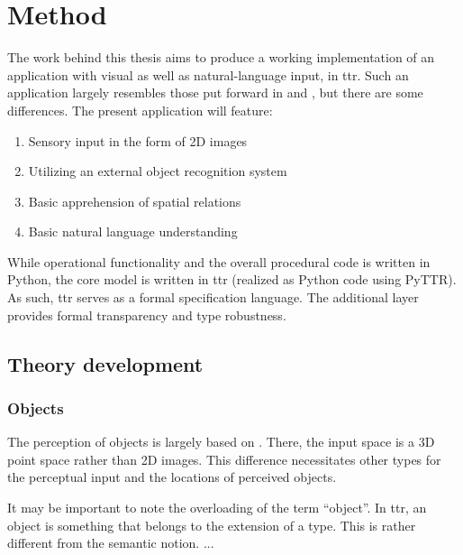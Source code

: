 \section{Method}
\label{sec:method}

The work behind this thesis aims to produce a working implementation of an application with visual as well as natural-language input, in \gls{ttr}.
Such an application largely resembles those put forward in \cite{lspc} and \cite{ttrspat}, but there are some differences.
The present application will feature:

\begin{enumerate}
\item Sensory input in the form of 2D images
\item Utilizing an external object recognition system
\item Basic apprehension of spatial relations
\item Basic natural language understanding
\end{enumerate}

While operational functionality and the overall procedural code is written in Python, the core model is written in \gls{ttr} (realized as Python code using PyTTR).
As such, \gls{ttr} serves as a formal specification language.
The additional layer provides formal transparency and type robustness.



\subsection{Theory development}
\label{ssec:theory}



\subsubsection{Objects}


The perception of objects is largely based on \cite{lspc}.
There, the input space is a 3D point space rather than 2D images.
This difference necessitates other types for the perceptual input and the locations of perceived objects.



It may be important to note the overloading of the term ``object''.
In \gls{ttr}, an object is something that belongs to the extension of a type.
This is rather different from the semantic notion.
...


